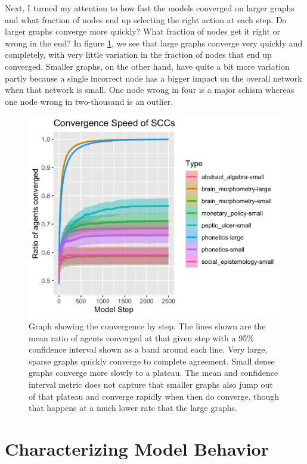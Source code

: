 Next, I turned my attention to how fast the models converged on larger
graphs and what fraction of nodes end up selecting the right action at
each step. Do larger graphs converge more quickly? What fraction of
nodes get it right or wrong in the end? In figure
\ref{fig:convergespeed}, we see that large graphs converge very quickly
and completely, with very little variation in the fraction of nodes that
end up converged. Smaller graphs, on the other hand, have quite a bit
more variation partly because a single incorrect node has a bigger
impact on the overall network when that network is small. One node wrong
in four is a major schism whereas one node wrong in two-thousand is an
outlier.

\begin{figure}
\hypertarget{fig:convergespeed}{%
\centering
\includegraphics{figures/converge_speed.png}
\caption{Graph showing the convergence by step. The lines shown are the
mean ratio of agents converged at that given step with a 95\% confidence
interval shown as a band around each line. Very large, sparse graphs
quickly converge to complete agreement. Small dense graphs converge more
slowly to a plateau. The mean and confidence interval metric does not
capture that smaller graphs also jump out of that plateau and converge
rapidly when then do converge, though that happens at a much lower rate
that the large graphs.}\label{fig:convergespeed}
}
\end{figure}

\hypertarget{characterizing-model-behavior}{%
\section{Characterizing Model
Behavior}\label{characterizing-model-behavior}}


